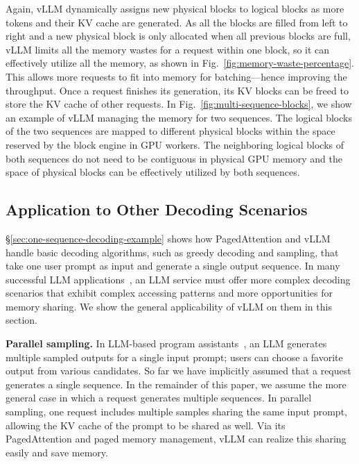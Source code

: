 Again, vLLM dynamically assigns new physical blocks to logical blocks as more tokens and their KV cache are generated. As all the blocks are filled from left to right and a new physical block is only allocated when all previous blocks are full, vLLM limits all the memory wastes for a request within one block, so it can effectively utilize all the memory, as shown in Fig.~\ref{fig:memory-waste-percentage}. This allows more requests to fit into memory for batching---hence improving the throughput. Once a request finishes its generation, its KV blocks can be freed to store the KV cache of other requests. In Fig.~\ref{fig:multi-sequence-blocks}, we show an example of vLLM managing the memory for two sequences. The logical blocks of the two sequences are mapped to different physical blocks within the space reserved by the block engine in GPU workers. The neighboring logical blocks of both sequences do not need to be contiguous in physical GPU memory and the space of physical blocks can be effectively utilized by both sequences.

\subsection{Application to Other Decoding Scenarios}
\label{sec:decoding-scenerios}

\S\ref{sec:one-sequence-decoding-example} shows how PagedAttention and vLLM handle basic decoding algorithms, such as greedy decoding and sampling, that take one user prompt as input and generate a single output sequence. In many successful LLM applications~\cite{copilot, openaiapi}, an LLM service must offer more complex decoding scenarios that exhibit complex accessing patterns and more opportunities for memory sharing. We show the general applicability of vLLM on them in this section. 

\textbf{Parallel sampling.} In LLM-based program assistants~\cite{chen2021evaluating, copilot}, an LLM generates multiple sampled outputs for a single input prompt; users can choose a favorite output from various candidates. So far we have implicitly assumed that a request generates a single sequence. In the remainder of this paper, we assume the more general case in which a request generates multiple sequences. In parallel sampling, one request includes multiple samples sharing the same input prompt, allowing the KV cache of the prompt to be shared as well. Via its PagedAttention and paged memory management, vLLM can realize this sharing easily and save memory. 

